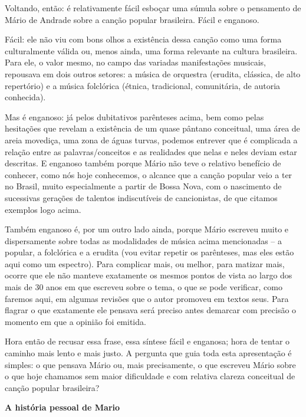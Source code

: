 Voltando, então: é relativamente fácil esboçar uma súmula sobre o
pensamento de Mário de Andrade sobre a canção popular brasileira. Fácil
e enganoso.

Fácil: ele não viu com bons olhos a existência dessa canção como uma
forma culturalmente válida ou, menos ainda, uma forma relevante na
cultura brasileira. Para ele, o valor mesmo, no campo das variadas
manifestações musicais, repousava em dois outros setores: a música de
orquestra (erudita, clássica, de alto repertório) e a música folclórica
(étnica, tradicional, comunitária, de autoria conhecida).

Mas é enganoso: já pelos dubitativos parênteses acima, bem como pelas
hesitações que revelam a existência de um quase pântano conceitual, uma
área de areia movediça, uma zona de águas turvas, podemos entrever que é
complicada a relação entre as palavras/conceitos e as realidades que
nelas e neles deviam estar descritas. E enganoso também porque Mário não
teve o relativo benefício de conhecer, como nós hoje conhecemos, o
alcance que a canção popular veio a ter no Brasil, muito especialmente a
partir de Bossa Nova, com o nascimento de sucessivas gerações de
talentos indiscutíveis de cancionistas, de que citamos exemplos logo
acima.

Também enganoso é, por um outro lado ainda, porque Mário escreveu muito
e dispersamente sobre todas as modalidades de música acima mencionadas
-- a popular, a folclórica e a erudita (vou evitar repetir os
parênteses, mas eles estão aqui como um espectro). Para complicar mais,
ou melhor, para matizar mais, ocorre que ele não manteve exatamente os
mesmos pontos de vista ao largo dos mais de 30 anos em que escreveu
sobre o tema, o que se pode verificar, como faremos aqui, em algumas
revisões que o autor promoveu em textos seus. Para flagrar o que
exatamente ele pensava será preciso antes demarcar com precisão o
momento em que a opinião foi emitida.

Hora então de recusar essa frase, essa síntese fácil e enganosa; hora de
tentar o caminho mais lento e mais justo. A pergunta que guia toda esta
apresentação é simples: o que pensava Mário ou, mais precisamente, o que
escreveu Mário sobre o que hoje chamamos sem maior dificuldade e com
relativa clareza conceitual de canção popular brasileira?

\textbf{A história pessoal de Mario}

